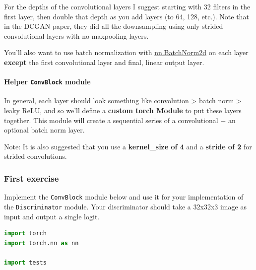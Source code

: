For the depths of the convolutional layers I suggest starting with 32
filters in the first layer, then double that depth as you add layers (to
64, 128, etc.). Note that in the DCGAN paper, they did all the
downsampling using only strided convolutional layers with no maxpooling
layers. \newline

You'll also want to use batch normalization with
\href{https://pytorch.org/docs/stable/nn.html\#batchnorm2d}{nn.BatchNorm2d}
on each layer \textbf{except} the first convolutional layer and final,
linear output layer.

\paragraph{\texorpdfstring{Helper \texttt{ConvBlock}
module}{Helper ConvBlock module}}

In general, each layer should look something like convolution
\textgreater{} batch norm \textgreater{} leaky ReLU, and so we'll define
a \textbf{custom torch Module} to put these layers together. This module
will create a sequential series of a convolutional + an optional batch
norm layer.\newline

Note: It is also suggested that you use a \textbf{kernel\_size of 4} and
a \textbf{stride of 2} for strided convolutions.

\subsubsection{First exercise}

Implement the \lstinline{ConvBlock} module below and use
it for your implementation of the
\lstinline{Discriminator} module. Your discriminator
should take a 32x32x3 image as input and output a single logit.

\begin{lstlisting}[language=Python]
import torch
import torch.nn as nn

import tests
\end{lstlisting}

